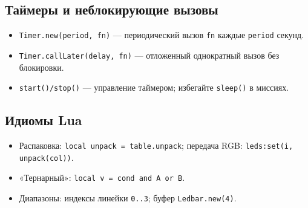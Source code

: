 \subsection{Таймеры и неблокирующие вызовы}
\begin{itemize}
  \item \texttt{Timer.new(period, fn)} — периодический вызов \texttt{fn} каждые \texttt{period} секунд.
  \item \texttt{Timer.callLater(delay, fn)} — отложенный однократный вызов без блокировки.
  \item \texttt{start()/stop()} — управление таймером; избегайте \texttt{sleep()} в миссиях.
\end{itemize}

\subsection{Идиомы Lua}
\begin{itemize}
  \item Распаковка: \texttt{local unpack = table.unpack}; передача RGB: \texttt{leds:set(i, unpack(col))}.
  \item «Тернарный»: \texttt{local v = cond and A or B}.
  \item Диапазоны: индексы линейки \texttt{0..3}; буфер \texttt{Ledbar.new(4)}.
\end{itemize}
